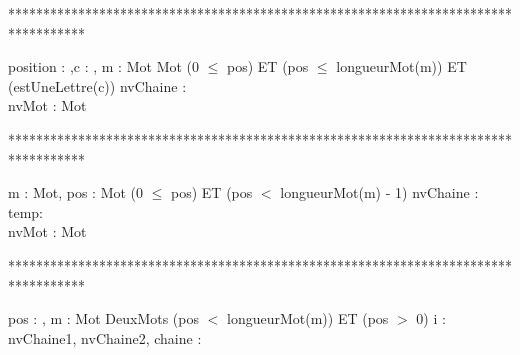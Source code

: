 ***********************************************************************************
\begin{algorithme}%
       {position : \naturelNonNul,c : \caractere, m : Mot}%
       {Mot}%
       {(0 $\leq$ pos) ET (pos $\leq$ longueurMot(m)) ET (estUneLettre(c))}
       {nvChaine : \chaine \\ nvMot : Mot}
       {
       }
\end{algorithme}

***********************************************************************************
\begin{algorithme}%
      {m : Mot, pos : \naturelNonNul}%
      {Mot}%
      {(0 $\leq$ pos) ET (pos $<$ longueurMot(m) - 1)}%
      {nvChaine : \chaine \\ temp: \caractere \\ nvMot : Mot}%
      {
      }
\end{algorithme}

***********************************************************************************
\begin{algorithme}
         {pos : \naturelNonNul, m : Mot}%
         {DeuxMots}%
         {(pos $<$ longueurMot(m)) ET (pos $>$ 0)}%
         {i : \naturelNonNul \\ nvChaine1, nvChaine2, chaine : \chaine}%
         {
            {
            }
            {
            }
          }
\end{algorithme}

